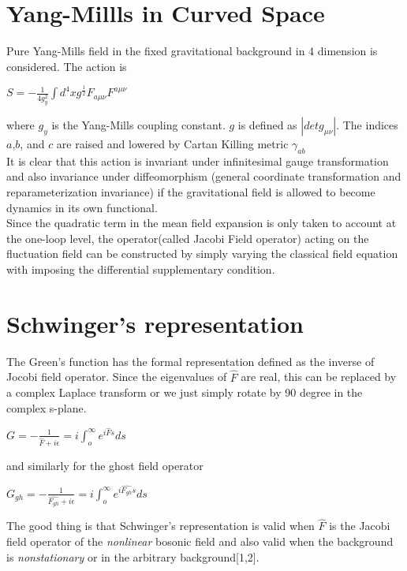 \documentclass[a4paper,12 pt]{article}
\begin{document}
\section{Yang-Millls in Curved Space}
Pure Yang-Mills field in the fixed gravitational background in 4
dimension is considered. The action is
\begin{center}
  $ S = - \frac{1}{4 g_{y}^{2}}\int d^{4}x
  g^{\frac{1}{2}}F_{a\mu\nu}F^{a\mu\nu} \
$
\end{center}
 where $g_{y}$ is the Yang-Mills coupling constant.
 $g$ is
 defined as $|detg_{\mu\nu}|$. The indices $a$,$ b$, and $c$ are
 raised and lowered by Cartan Killing metric $\gamma_{ab}$
 \\ It is clear that this action is invariant under
 infinitesimal gauge transformation and also invariance under
 diffeomorphism (general coordinate transformation and reparameterization invariance)
 if the gravitational field is allowed to become dynamics in its
 own functional.\\
 Since the
 quadratic term in the mean field expansion is only taken to
 account at the one-loop level, the operator(called Jacobi Field operator)
 acting on the fluctuation field
 can be constructed by simply varying the classical field equation with
 imposing the differential supplementary condition.

\section{Schwinger's representation}
The Green's function has the formal representation defined as the
inverse of Jocobi field operator. Since the eigenvalues of
$\hat{F}$ are real, this can be replaced by a complex Laplace
transform or we just simply rotate by 90 degree in the complex
s-plane.
\begin{center}
$G = -\frac{1}{\hat{F}+i\epsilon} = i\int_{o}^{\infty}e^{i \hat{F}
s} ds$
\end{center}
and similarly for the ghost field operator
\begin{center}
$ G_{gh} = -\frac{1}{\hat{F_{gh}}+i\epsilon} =
i\int_{o}^{\infty}e^{i \hat{F_{gh}} s} ds$
\end{center}

 The good thing is that Schwinger's representation is valid when
  $\hat{F}$ is the Jacobi field
 operator of the {\it nonlinear} bosonic field and also valid when the
 background is {\it nonstationary} or in the
 arbitrary background[1,2].
\end{document}
